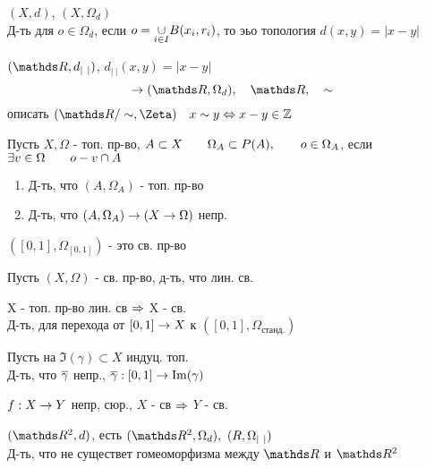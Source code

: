 \documentclass[geometry.tex]{subfiles}
\begin{document}
  \begin{upr}
      $(X,d)$, $(X, \Omega_d)$\\
      Д-ть для $o \in \Omega_d$, если $o = \underset{i \in I}{\cup} B(x_i, r_i)$, то эьо топология $d(x,y) = |x - y|$
  \end{upr}

  \begin{upr}
      $(\R, d_{|\ |})$, $d_{|\ |}(x,y) = |x - y|$\\
      \[\ra(\R, \Omega_d),\q \R,\q \sim\]
      описать $(\R/\sim, \Zeta)\q x \sim y \lra x - y \in \Z$
  \end{upr}

  \begin{task}
      Пусть $X, \Omega$ - топ. пр-во, $A \subset X \qquad \Omega_A \subset P(A), \qquad o \in \Omega_A$, если $\exists v \in \Omega \qquad o - v \cap A$
      \begin{enumerate}
        \item Д-ть, что $(A, \Omega_A)$ - топ. пр-во
        \item Д-ть, что $(A, \Omega_A) \rightarrow (X \rightarrow \Omega)$ непр.
      \end{enumerate}
  \end{task}

  \begin{utv}
      $([0,1], \Omega_{[0,1]})$ - это св. пр-во
  \end{utv}

  \begin{task}
      Пусть $(X, \Omega)$ - св. пр-во, д-ть, что лин. св.
  \end{task}

  \begin{utv}
      X - топ. пр-во лин. св $\Rightarrow$ X - св.\\
      Д-ть, для перехода от $[0,1] \rightarrow X$ к $([0,1], \Omega_{\text{станд.}})$
  \end{utv}

  \begin{task}
       Пусть на $\Im(\gamma) \subset X$ индуц. топ.\\
       Д-ть, что $\overline{\gamma}$ непр., $\overline{\gamma}: [0,1] \rightarrow \mathop{\rm Im}\nolimits(\gamma)$
  \end{task}

  \begin{theorem}
      $f: X \rightarrow Y$ непр, сюр., $X$ - св $\Rightarrow$ $Y$ - св.
  \end{theorem}

  \begin{task}
      $(\R^2, d)$, есть $(\R^2, \Omega_d),\ (R, \Omega_{|\ |})$\\
      Д-ть, что не существет гомеоморфизма между $\R$ и $\R^2$
  \end{task}
\end{document}
